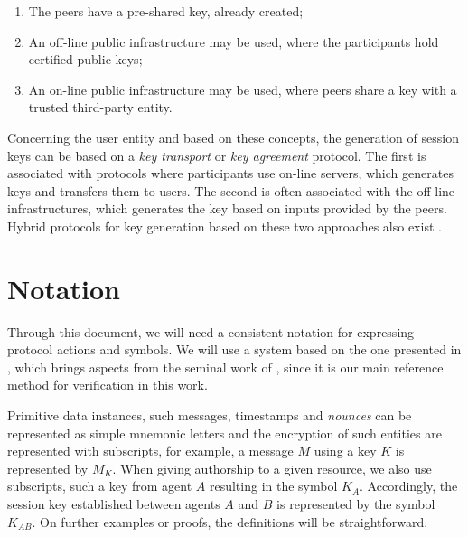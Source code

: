 \begin{enumerate}
  \item The peers have a pre-shared key, already created;
  \item An off-line public infrastructure may be used, where the participants hold certified public keys;
  \item An on-line public infrastructure may be used, where peers share a key with a trusted third-party entity.
\end{enumerate}

Concerning the user entity and based on these concepts, the generation of session keys can be based on a \textit{key transport} or \textit{key agreement} protocol. The first is associated with protocols where participants use on-line servers, which generates keys and transfers them to users. The second is often associated with the off-line infrastructures, which generates the key based on inputs provided by the peers. Hybrid protocols for key generation based on these two approaches also exist \cite{BoydMathuria2008}.
























\section{Notation}
Through this document, we will need a consistent notation for expressing protocol actions and symbols. We will use a system based on the one presented in \cite{Bella2007}, which brings aspects from the seminal work of \cite{Burrows90}, since it is our main reference method for verification in this work.

Primitive data instances, such messages, timestamps and \textit{nounces} can be represented as simple mnemonic letters and the encryption of such entities are represented with subscripts, for example, a message $M$ using a key $K$ is represented by $M_K$. When giving authorship to a given resource, we also use subscripts, such a key from agent $A$ resulting in the symbol $K_A$. Accordingly, the session key established between agents $A$ and $B$ is represented by the symbol $K_{AB}$. On further examples or proofs, the definitions will be straightforward.

